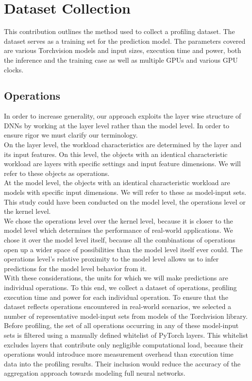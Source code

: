 \chapter{Dataset Collection}\label{chap:contrib1}


This contribution outlines the method used to collect a profiling dataset. The  dataset serves as a training set for the prediction model. The parameters covered are various Torchvision models and input sizes, execution time and power, both the inference and the training case as well as multiple GPUs and various GPU clocks.


\section{Operations}


In order to increase generality, our approach exploits the layer wise structure of DNNs by working at the layer level rather than the model level. In order to ensure rigor we must clarify our terminology. \\
On the layer level, the workload characteristics are determined by the layer and its input features. On this level, the objects with an identical characteristic workload are layers with specific settings and input feature dimensions. We will refer to these objects as operations. \\
At the model level, the objects with an identical characteristic workload are models with specific input dimensions. We will refer to these as model-input sets.\\ 
This study could have been conducted on the model level, the operations level or the kernel level.  \\
We chose the operations level over the kernel level, because it is  closer to the model level which determines the performance of real-world applications. We chose it over the model level itself, because all the combinations of operations open up a wider space of possibilities than the model level itself ever could. The operations level's relative proximity to the model level allows us to infer predictions for the model level behavior from it. \\
With these considerations, the units for which we will make predictions are individual operations. To this end, we collect a dataset of operations, profiling execution time and power for each individual operation. To ensure that the dataset reflects operations encountered in real-world scenarios, we selected a number of representative model-input sets from models of the Torchvision library. \\
Before profiling, the set of all operations occurring in any of these model-input sets is filtered using a manually defined whitelist of PyTorch layers. This whitelist excludes layers that contribute only negligible computational load, because their operations would introduce more measurement overhead than execution time data into the profiling results. Their inclusion would reduce the accuracy of the aggregation approach towards modeling full neural networks.

